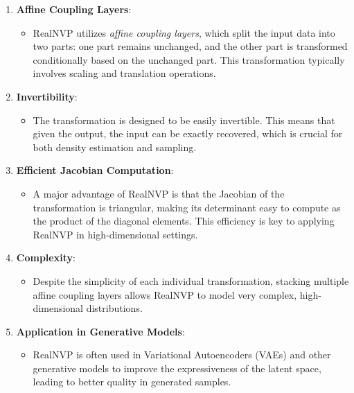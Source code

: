 \documentclass[11pt]{article}
\providecommand{\tightlist}{%
      \setlength{\itemsep}{0pt}\setlength{\parskip}{0pt}}
\begin{document}
\begin{enumerate}
\def\labelenumi{\arabic{enumi}.}
\tightlist
\item
  \textbf{Affine Coupling Layers}:

  \begin{itemize}
  \tightlist
  \item
    RealNVP utilizes \emph{affine coupling layers}, which split the
    input data into two parts: one part remains unchanged, and the other
    part is transformed conditionally based on the unchanged part. This
    transformation typically involves scaling and translation
    operations.
  \end{itemize}
\item
  \textbf{Invertibility}:

  \begin{itemize}
  \tightlist
  \item
    The transformation is designed to be easily invertible. This means
    that given the output, the input can be exactly recovered, which is
    crucial for both density estimation and sampling.
  \end{itemize}
\item
  \textbf{Efficient Jacobian Computation}:

  \begin{itemize}
  \tightlist
  \item
    A major advantage of RealNVP is that the Jacobian of the
    transformation is triangular, making its determinant easy to compute
    as the product of the diagonal elements. This efficiency is key to
    applying RealNVP in high-dimensional settings.
  \end{itemize}
\item
  \textbf{Complexity}:

  \begin{itemize}
  \tightlist
  \item
    Despite the simplicity of each individual transformation, stacking
    multiple affine coupling layers allows RealNVP to model very
    complex, high-dimensional distributions.
  \end{itemize}
\item
  \textbf{Application in Generative Models}:

  \begin{itemize}
  \tightlist
  \item
    RealNVP is often used in Variational Autoencoders (VAEs) and other
    generative models to improve the expressiveness of the latent space,
    leading to better quality in generated samples.
  \end{itemize}
\end{enumerate}
\end{document}
